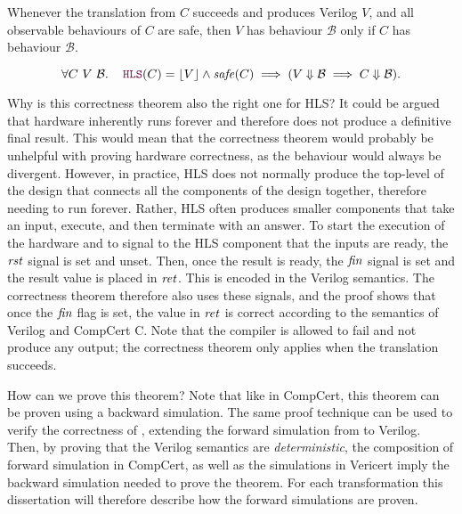 \begin{theorem}
  Whenever the translation from $C$ succeeds and produces Verilog $V\!$, and all
  observable behaviours of $C$ are safe, then $V\!$ has behaviour $\mathcal{B}$
  only if $C$ has behaviour $\mathcal{B}$.

  {\normalfont\begin{equation} \forall C\ V\ \mathcal{B}\ldotp\quad \yhfunction{HLS} (C)
      = \ccok{V} \land \mathit{safe}(C) \implies (V \Downarrow \mathcal{B}
      \implies C \Downarrow \mathcal{B}).
  \end{equation}}
\end{theorem}

Why is this correctness theorem also the right one for HLS?  It could be argued
that hardware inherently runs forever and therefore does not produce a
definitive final result.  This would mean that the \compcert{} correctness
theorem would probably be unhelpful with proving hardware correctness, as the
behaviour would always be divergent.  However, in practice, HLS does not
normally produce the top-level of the design that connects all the components of
the design together, therefore needing to run forever.  Rather, \gls{HLS} often
produces smaller components that take an input, execute, and then terminate with
an answer.  To start the execution of the hardware and to signal to the HLS
component that the inputs are ready, the $\mathit{rst}$ signal is set and unset.
Then, once the result is ready, the $\mathit{fin}$ signal is set and the result
value is placed in $\mathit{ret}$.  This is encoded in the Verilog semantics.  The
correctness theorem therefore also uses these signals, and the proof shows that
once the $\mathit{fin}$ flag is set, the value in $\mathit{ret}$ is correct
according to the semantics of Verilog and CompCert C.  Note that the compiler is
allowed to fail and not produce any output; the correctness theorem only applies
when the translation succeeds.

How can we prove this theorem?  Note that like in CompCert, this theorem can be
proven using a backward simulation.  The same proof technique can be used to
verify the correctness of \vericert{}, extending the forward simulation from
\rtl{} to Verilog.  Then, by proving that the Verilog semantics are
\emph{deterministic}, the composition of forward simulation in CompCert, as well
as the simulations in Vericert imply the backward simulation needed to prove the
theorem.  For each transformation this dissertation will therefore describe how
the forward simulations are proven.

